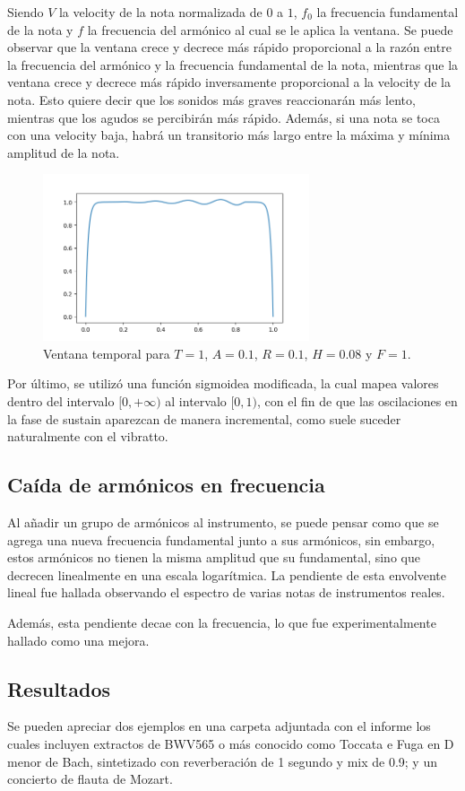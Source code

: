 Siendo $V$ la velocity de la nota normalizada de $0$ a $1$, $f_0$ la frecuencia fundamental de la nota y $f$ la frecuencia del armónico al cual se le aplica la ventana. Se puede observar que la ventana crece y decrece más rápido proporcional a la razón entre la frecuencia del armónico y la frecuencia fundamental de la nota, mientras que la ventana crece y decrece más rápido inversamente proporcional a la velocity de la nota. Esto quiere decir que los sonidos más graves reaccionarán más lento, mientras que los agudos se percibirán más rápido. Además, si una nota se toca con una velocity baja, habrá un transitorio más largo entre la máxima y mínima amplitud de la nota.

\begin{figure}[H]
	\centering
	\includegraphics[width=0.7\textwidth]{ImagenesEjercicio2/adsr.png}
	\caption{Ventana temporal para $T = 1$, $A = 0.1$, $R = 0.1$, $H = 0.08$ y $F = 1$.}
	\label{vib}
\end{figure}

Por último, se utilizó una función sigmoidea modificada, la cual mapea valores dentro del intervalo $[0, +\infty)$ al intervalo $[0, 1)$, con el fin de que las oscilaciones en la fase de sustain aparezcan de manera incremental, como suele suceder naturalmente con el vibratto.

\subsection{Caída de armónicos en frecuencia}

Al añadir un grupo de armónicos al instrumento, se puede pensar como que se agrega una nueva frecuencia fundamental junto a sus armónicos, sin embargo, estos armónicos no tienen la misma amplitud que su fundamental, sino que decrecen linealmente en una escala logarítmica. La pendiente de esta envolvente lineal fue hallada observando el espectro de varias notas de instrumentos reales.

Además, esta pendiente decae con la frecuencia, lo que fue experimentalmente hallado como una mejora.

\subsection{Resultados}

Se pueden apreciar dos ejemplos en una carpeta adjuntada con el informe los cuales incluyen extractos de BWV565 o más conocido como Toccata e Fuga en D menor de Bach, sintetizado con reverberación de 1 segundo y mix de 0.9; y un concierto de flauta de Mozart.